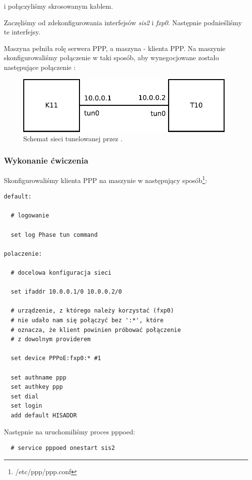 \pppcli{} i \pppserv{} połączyliśmy skrosowanym kablem.

Zaczęliśmy od zdekonfigurowania interfejsów \emph{sis2} i \emph{fxp0}.
Następnie podnieśliśmy te interfejsy.

Maszyna \pppserv{} pełniła rolę serwera PPP, a maszyna \pppcli{} - klienta PPP.
Na maszynie \pppcli{} skonfigurowaliśmy połączenie w taki sposób, aby wynegocjowane zostało następujące połączenie \tcp{}:

\begin{figure}[h!]
  \centering
  \includegraphics[width=11cm]{figury/ppp/schemat-po.pdf}
  \caption{Schemat sieci tunelowanej przez \ppp{}.}
  \label{fig:ppp:schemat-sieci-przed}
\end{figure}

\subsubsection{Wykonanie ćwiczenia}
Skonfigurowaliśmy klienta PPP na maszynie \pppcli{} w następujący sposób\footnote{/etc/ppp/ppp.conf}:

\begin{lstlisting}
default:

  # logowanie

  set log Phase tun command

polaczenie:

  # docelowa konfiguracja sieci

  set ifaddr 10.0.0.1/0 10.0.0.2/0 

  # urządzenie, z którego należy korzystać (fxp0)
  # nie udało nam się połączyć bez ':*', które
  # oznacza, że klient powinien próbować połączenie
  # z dowolnym providerem

  set device PPPoE:fxp0:* #1

  set authname ppp
  set authkey ppp
  set dial
  set login
  add default HISADDR
\end{lstlisting}

Następnie na \pppserv{} uruchomiliśmy proces pppoed:


\begin{lstlisting}
  # service pppoed onestart sis2
\end{lstlisting}

